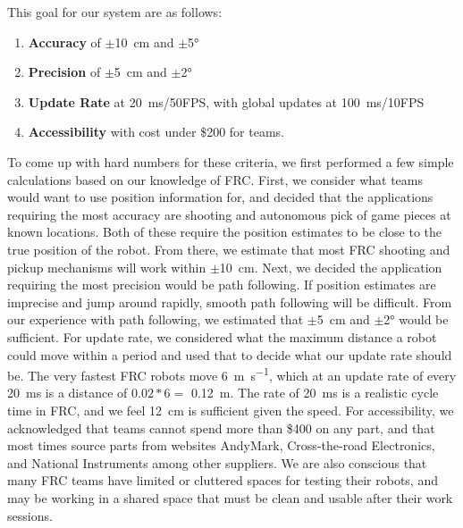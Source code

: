 \documentclass{article}
\begin{document}
    This goal for our system are as follows:

    \begin{enumerate}
      \item \textbf{Accuracy} of $\pm$\SI{10}{\centi\meter} and $\pm$\ang{5}
      \item \textbf{Precision} of $\pm$\SI{5}{\centi\meter} and $\pm$\ang{2}
      \item \textbf{Update Rate} at \SI{20}{\milli\second}/50FPS, with global updates at \SI{100}{\milli\second}/10FPS
      \item \textbf{Accessibility} with cost under \$200 for teams.
    \end{enumerate}

    To come up with hard numbers for these criteria, we first performed a few simple calculations based on our knowledge of FRC. First, we consider what teams would want to use position information for, and decided that the applications requiring the most accuracy are shooting and autonomous pick of game pieces at known locations. Both of these require the position estimates to be close to the true position of the robot. From there, we estimate that most FRC shooting and pickup mechanisms will work within $\pm$\SI{10}{\centi\meter}. Next, we decided the application requiring the most precision would be path following. If position estimates are imprecise and jump around rapidly, smooth path following will be difficult. From our experience with path following, we estimated that $\pm$\SI{5}{\centi\meter} and  $\pm$\ang{2} would be sufficient. For update rate, we considered what the maximum distance a robot could move within a period and used that to decide what our update rate should be. The very fastest FRC robots move \SI{6}{\meter\per\second}, which at an update rate of every \SI{20}{\milli\second} is a distance of $0.02*6 =$ \SI{0.12}{\meter}. The rate of \SI{20}{\milli\second} is a realistic cycle time in FRC, and we feel \SI{12}{\centi\meter} is sufficient given the speed. For accessibility, we acknowledged that teams cannot spend more than \$400 on any part, and that most times source parts from websites AndyMark, Cross-the-road Electronics, and National Instruments among other suppliers. We are also conscious that many FRC teams have limited or cluttered spaces for testing their robots, and may be working in a shared space that must be clean and usable after their work sessions.
\end{document}
